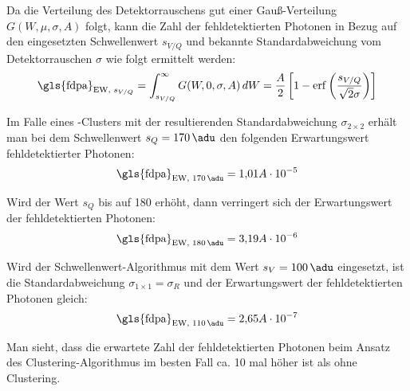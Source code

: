 \noindent
Da die Verteilung des Detektorrauschens gut einer Gauß-Verteilung $G(W, \mu, \sigma, A)$ folgt, kann die Zahl der fehldetektierten Photonen in Bezug auf den eingesetzten Schwellenwert $s_{V/Q}$ und bekannte Standardabweichung vom Detektorrauschen $\sigma$ wie folgt ermittelt werden: 
\begin{equation}
    \text{\gls{fdpa}}_{\text{EW, $s_{V/Q}$}}=\int_{s_{V/Q}}^\infty G(W, 0, \sigma, A) \,dW = \frac{A}{2}\left[1 - \erf\left({\frac{s_{V/Q}}{\sqrt{2}\sigma}}\right)\right]
\end{equation}

\noindent
Im Falle eines -Clusters mit der resultierenden Standardabweichung $\sigma_{2\times 2}$ erhält man bei dem Schwellenwert $s_Q = \SI{170}{\adu}$ den folgenden Erwartungswert fehldetektierter Photonen:
\begin{equation}
     \text{\gls{fdpa}}_{\text{EW, \SI{170}{\adu}}} = 1{,}01A\cdot 10^{-5} %
\end{equation}

\noindent
Wird der Wert $s_Q$ bis auf \SI{180}{\adu} erhöht, dann verringert sich der Erwartungswert der fehldetektierten Photonen:
\begin{equation}
    \text{\gls{fdpa}}_{\text{EW, \SI{180}{\adu}}} = 3{,}19A\cdot 10^{-6} %
\end{equation}

\noindent
Wird der Schwellenwert-Algorithmus mit dem Wert $s_V = \SI{100}{\adu}$ eingesetzt, ist die Standardabweichung $\sigma_{1\times 1} = \sigma_{R}$ und der Erwartungswert der fehldetektierten Photonen gleich:
\begin{equation}
   \text{\gls{fdpa}}_{\text{EW, \SI{110}{\adu}}} = 2{,}65A\cdot 10^{-7} %
\end{equation}

\noindent
Man sieht, dass die erwartete Zahl der fehldetektierten Photonen beim Ansatz des Clustering-Al\-go\-rith\-mus im besten Fall ca. 10 mal höher ist als ohne Clustering. 

